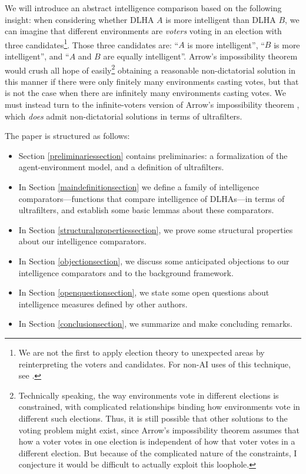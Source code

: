 \documentclass[twoside,11pt]{article}
\begin{document}
We will introduce an abstract intelligence comparison
based on the following insight:
when considering whether DLHA $A$ is more intelligent than DLHA $B$,
we can imagine that different environments are \emph{voters} voting in an election with
three candidates\footnote{We are not the first to apply election theory to unexpected
areas by reinterpreting the voters and candidates. For non-AI uses of this technique,
see \citep{okasha, stegenga}.}. Those three
candidates are: ``$A$ is more intelligent'',
``$B$ is more intelligent'', and ``$A$ and $B$ are equally intelligent''.
Arrow's impossibility theorem \citep{encyclopedia} would crush all hope of
easily\footnote{Technically speaking, the way environments vote in different elections
is constrained, with complicated relationships binding how
environments vote in different such elections. Thus, it is still possible that
other solutions to the voting problem might exist, since Arrow's impossibility theorem
assumes that
how a voter votes in one election is independent of how that voter votes
in a different election. But
because of the complicated nature of the constraints, I conjecture it
would be difficult to actually exploit this loophole.}
obtaining a
reasonable non-dictatorial solution in this manner if there were only finitely many
environments
casting votes, but that is not the case when there are infinitely many environments
casting votes.
We must instead turn to the infinite-voters version of
Arrow's impossibility theorem \citep{kirman} \citep[see also][]{fishburn},
which \emph{does} admit non-dictatorial solutions in terms of ultrafilters.

The paper is structured as follows:
\begin{itemize}
    \item Section \ref{preliminariessection} contains preliminaries:
    a formalization of the agent-environment model, and a definition of ultrafilters.
    \item
    In Section \ref{maindefinitionsection} we define a family of intelligence
    comparators---functions that compare intelligence of
    DLHAs---in terms of ultrafilters, and
    establish some basic lemmas about these comparators.
    \item
    In Section \ref{structuralpropertiessection}, we prove some structural
    properties about our intelligence comparators.
    \item
    In Section \ref{objectionsection}, we discuss some anticipated objections
    to our intelligence comparators and to the background framework.
    \item
    In Section \ref{openquestionsection}, we state some open questions about
    intelligence measures defined by other authors.
    \item
    In Section \ref{conclusionsection}, we summarize and make concluding remarks.
\end{itemize}
\end{document}
